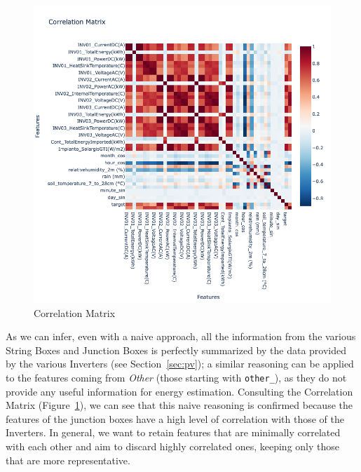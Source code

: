 \begin{figure}[H]
	\centering
	\includegraphics[width=\textwidth, keepaspectratio]{chapters/2_data_preprocessing/imgs/correlationmatrix.png}
	\caption{Correlation Matrix}\label{fig:corrmatrix}
\end{figure}
As we can infer, even with a naive approach, all the information from the various
String Boxes and Junction Boxes is perfectly summarized by the data provided by the
various Inverters (see Section~\ref{sec:pv}); a similar reasoning can be applied to the features
coming from \textit{Other} (those starting with \verb|other_|), as they do not provide any
useful information for energy estimation. Consulting the Correlation Matrix (Figure~\ref{fig:corrmatrix}), we can
see that this naive reasoning is confirmed because the features of the junction boxes
have a high level of correlation with those of the Inverters.
In general, we want to retain features that are minimally correlated with each other
and aim to discard highly correlated ones, keeping only those that are more representative.


